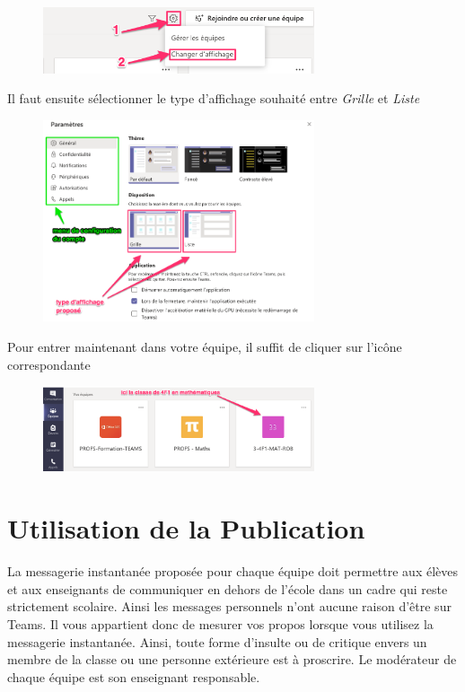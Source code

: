 \begin{figure}[h]
\includegraphics[width=8cm]{./images/teams/changement_liste}
\centering
\end{figure}

Il faut ensuite sélectionner le type d'affichage souhaité entre \textit{Grille} et \textit{Liste}

\begin{figure}[h]
\includegraphics[width=8cm]{./images/teams/choix_parametre}
\centering
\end{figure}

 Pour entrer maintenant dans votre équipe, il suffit de cliquer sur l'icône correspondante

\begin{figure}[H]
\includegraphics[width=8cm]{./images/teams/entree_classe}
\centering
\end{figure}


\newpage
\section{Utilisation de la Publication}

La messagerie instantanée proposée pour chaque équipe doit permettre aux élèves et aux enseignants de communiquer en dehors de l'école dans un cadre qui reste strictement scolaire. Ainsi les messages personnels n'ont aucune raison d'être sur Teams. Il vous appartient donc de mesurer vos propos lorsque vous utilisez la messagerie instantanée. Ainsi, toute forme d'insulte ou de critique envers un membre de la classe ou une personne extérieure est à proscrire. Le modérateur de chaque équipe est son enseignant responsable.\\

